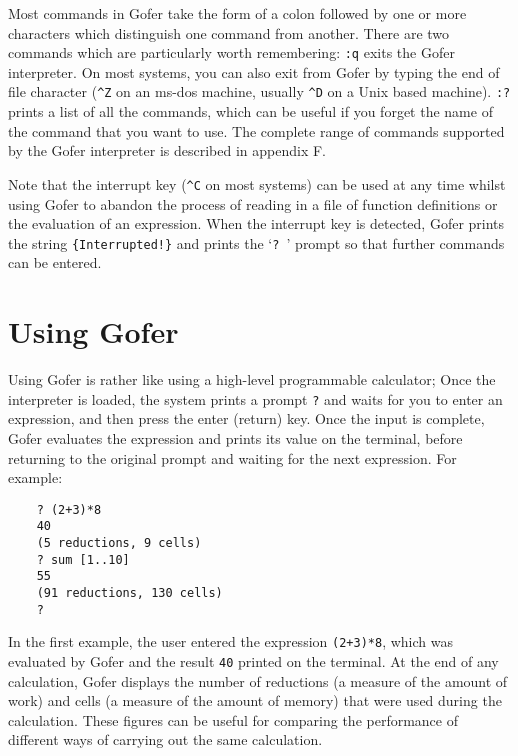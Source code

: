 Most commands in Gofer take the form of a colon followed by one or more
characters which distinguish one command from another.  There  are  two
commands which are particularly worth remembering:
\BI
\IT \verb":q"  exits the  Gofer  interpreter.   On most systems, you can also
     exit from Gofer by typing the end of  file  character  (\verb=^Z=  on  an
     {\sc ms-dos} machine, usually \verb=^D= on a Unix based machine).
\IT \verb":?"  prints a list of all the commands,  which can be useful if you
     forget the name of the command that you want to use.
\EI
The complete range of commands supported by the  Gofer  interpreter  is
described in appendix F.

Note that the interrupt key (\verb=^C= on most systems) can  be  used  at  any
time whilst using Gofer to abandon the process of reading in a file  of
function definitions or the evaluation  of  an  expression.   When  the
interrupt key is detected, Gofer prints the string \verb={Interrupted!}= and
prints the `\verb=? =' prompt so that further commands can be entered.


\chapter{Using Gofer} %

Using Gofer is rather like using a high-level programmable  calculator;
Once the interpreter is loaded, the system  prints  a  prompt  \verb"?"  and
waits for you to enter an expression, and then press the enter (return)
key.  Once the input is complete, Gofer evaluates  the  expression  and
prints its value on the terminal,  before  returning  to  the  original
prompt and waiting for the next expression.  For example:
\begin{verbatim}
    ? (2+3)*8
    40
    (5 reductions, 9 cells)
    ? sum [1..10]
    55
    (91 reductions, 130 cells)
    ? 
\end{verbatim}
In the first example, the user entered the expression \verb"(2+3)*8",  which
was evaluated by Gofer and the result \verb"40" printed on the terminal.  At
the end of any calculation, Gofer displays the number of reductions  (a
measure of the amount of work) and cells (a measure of  the  amount  of
memory) that were used during the calculation.  These  figures  can  be
useful for comparing the performance of different ways of carrying  out
the same calculation.

